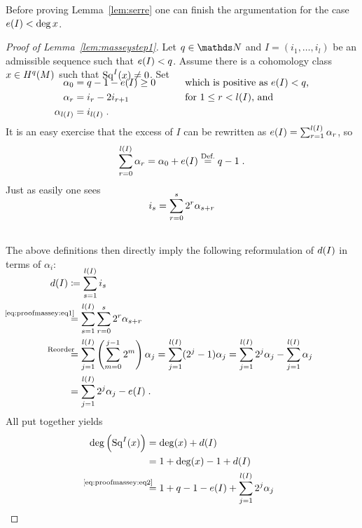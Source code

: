 Before proving Lemma~\ref{lem:serre} one can finish the argumentation for
the case $e(I)<\deg x$.
\begin{proof}[Proof of Lemma~\ref{lem:masseystep1}]
  Let $q\in\Nat$ and $I=(i_1,\dotsc,i_l)$ be an admissible sequence such that
  $e(I)<q$.
  Assume there is a cohomology class $x\in H^q(M)$ such that $\mathrm{Sq}^{I}(x)\neq0$.
  Set
  \begin{alignat*}{4}
    \SwapAboveDisplaySkip
    \alpha_0 &= q-1-\e(I)\geq 0 &\qquad&\text{which is positive as $\e(I)<q$,} \\
    \alpha_r &= i_{r}-2i_{r+1}  &&\text{for $1\leq r< \l(I)$, and} \\ 
    \alpha_{\l(I)} &= i_{\l(I)}
    \;.
  \end{alignat*}
  It is an easy exercise that the excess of $I$ can be rewritten as
  $e(I)=\sum_{r=1}^{l(I)}\alpha_r$, so
  \begin{gather}\label{eq:alpha0}
    \sum_{r=0}^{l(I)}\alpha_r = \alpha_0 + e(I) \overset{\text{Def.}}= q-1
    \;.
  \end{gather}
  Just as easily one sees
  \begin{align}
    \SwapAboveDisplaySkip
    \label{eq:proofmassey:eq1}
    i_s
    &= \sum_{r=0}^{s}2^r\alpha_{s+r}\\\notag
  \end{align}
  The above definitions then directly imply the following reformulation
  of $d(I)$ in terms of $\alpha_i$:
  \begin{align}
    \SwapAboveDisplaySkip
    \notag
    \d(I)
    &\coloneqq \sum_{s=1}^{\l(I)}i_s  \\\notag
    &\equalsby{\eqref{eq:proofmassey:eq1}}
      \sum_{s=1}^{\l(I)}\sum_{r=0}^{s}2^r\alpha_{s+r}\\\notag
    &\equalsby{Reorder} \sum_{j=1}^{\l(I)}
      \left(\sum_{m=0}^{j-1}2^m\right)\alpha_j
      = \sum_{j=1}^{\l(I)}(2^j-1)\alpha_j 
      = \sum_{j=1}^{\l(I)}2^j\alpha_j
      - \sum_{j=1}^{\l(I)}\alpha_j\\
    \label{eq:proofmassey:eq2}
    &= \sum_{j=1}^{\l(I)}2^j\alpha_j
      - \e(I)
      \;.
  \end{align}
  All put together yields
  \begin{align*}
    \deg\left(\Sq I(x)\right)
    &= \deg(x) + \d(I)\\
    &= 1 + \deg(x) -1 +\d(I) \\
    &\equalsby{\eqref{eq:proofmassey:eq2}}
      1 + q - 1 - \e(I) + \sum_{j=1}^{\l(I)}2^j\alpha_j \\

\end{align*}
\end{proof}
